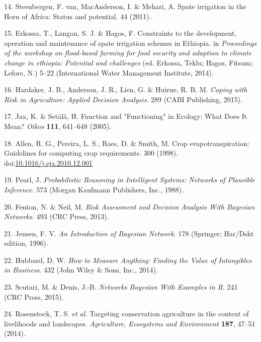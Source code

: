 \documentclass[12pt,oneside]{article}
\begin{document}
\leavevmode\hypertarget{ref-VanSteenbergen_et_al_2011}{}%
14. Steenbergen, F. van, MacAnderson, I. \& Mehari, A. Spate irrigation in the Horn of Africa: Status and potential. 44 (2011).

\leavevmode\hypertarget{ref-Erkossa_et_al_2014}{}%
15. Erkossa, T., Langan, S. J. \& Hagos, F. Constraints to the development, operation and maintenance of spate irrigation schemes in Ethiopia. in \emph{Proceedings of the workshop on flood-based farming for food security and adaption to climate change in ethiopia: Potential and challenges} (ed. Erkossa, Teklu; Hagos, Fitsum; Lefore, N.) 5--22 (International Water Management Institute, 2014).

\leavevmode\hypertarget{ref-Hardaker_et_al_2015}{}%
16. Hardaker, J. B., Anderson, J. R., Lien, G. \& Huirne, R. B. M. \emph{Coping with Risk in Agriculture: Applied Decision Analysis}. 289 (CABI Publishing, 2015).

\leavevmode\hypertarget{ref-Jax_and_Setala_2005}{}%
17. Jax, K. \& Setälä, H. Function and "Functioning" in Ecology: What Does It Mean? \emph{Oikos} \textbf{111}, 641--648 (2005).

\leavevmode\hypertarget{ref-Allen_et_al_1998}{}%
18. Allen, R. G., Pereira, L. S., Raes, D. \& Smith, M. Crop evapotranspiration: Guidelines for computing crop requirements. 300 (1998). doi:\href{https://doi.org/10.1016/j.eja.2010.12.001}{10.1016/j.eja.2010.12.001}

\leavevmode\hypertarget{ref-Pearl_1988}{}%
19. Pearl, J. \emph{Probabilistic Reasoning in Intelligent Systems: Networks of Plausible Inference}. 573 (Morgan Kaufmann Publishers, Inc., 1988).

\leavevmode\hypertarget{ref-Fenton_and_Neil_2013}{}%
20. Fenton, N. \& Neil, M. \emph{Risk Assessment and Decision Analysis With Bayesian Networks}. 493 (CRC Press, 2013).

\leavevmode\hypertarget{ref-Jensen_1996}{}%
21. Jensen, F. V. \emph{An Introduction of Bayesian Network}. 178 (Springer; Har/Dskt edition, 1996).

\leavevmode\hypertarget{ref-Hubbard_2014}{}%
22. Hubbard, D. W. \emph{How to Measure Anything: Finding the Value of Intangibles in Business}. 432 (John Wiley \& Sons, Inc., 2014).

\leavevmode\hypertarget{ref-Scutari_and_Denis_2015}{}%
23. Scutari, M. \& Denis, J.-B. \emph{Networks Bayesian With Examples in R}. 241 (CRC Press, 2015).

\leavevmode\hypertarget{ref-Rosenstock_et_al_2014}{}%
24. Rosenstock, T. S. \emph{et al.} Targeting conservation agriculture in the context of livelihoods and landscapes. \emph{Agriculture, Ecosystems and Environment} \textbf{187}, 47--51 (2014).
\end{document}
